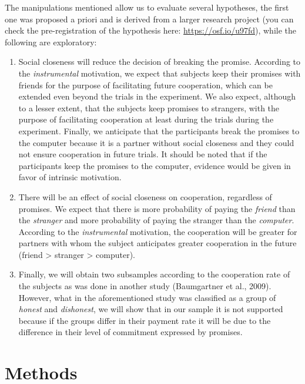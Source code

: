 \documentclass[12pt,]{article}
\begin{document}
The manipulations mentioned allow us to evaluate several hypotheses, the
first one was proposed a priori and is derived from a larger research
project (you can check the pre-registration of the hypothesis here:
\url{https://osf.io/u97fd}), while the following are exploratory:

\begin{enumerate}
\def\labelenumi{\arabic{enumi}.}
\item
  Social closeness will reduce the decision of breaking the promise.
  According to the \emph{instrumental} motivation, we expect that
  subjects keep their promises with friends for the purpose of
  facilitating future cooperation, which can be extended even beyond the
  trials in the experiment. We also expect, although to a lesser extent,
  that the subjects keep promises to strangers, with the purpose of
  facilitating cooperation at least during the trials during the
  experiment. Finally, we anticipate that the participants break the
  promises to the computer because it is a partner without social
  closeness and they could not ensure cooperation in future trials. It
  should be noted that if the participants keep the promises to the
  computer, evidence would be given in favor of intrinsic motivation.
\item
  There will be an effect of social closeness on cooperation, regardless
  of promises. We expect that there is more probability of paying the
  \emph{friend} than the \emph{stranger} and more probability of paying
  the stranger than the \emph{computer}. According to the
  \emph{instrumental} motivation, the cooperation will be greater for
  partners with whom the subject anticipates greater cooperation in the
  future (friend \textgreater{} stranger \textgreater{} computer).
\item
  Finally, we will obtain two subsamples according to the cooperation
  rate of the subjects as was done in another study (Baumgartner et al.,
  2009). However, what in the aforementioned study was classified as a
  group of \emph{honest} and \emph{dishonest}, we will show that in our
  sample it is not supported because if the groups differ in their
  payment rate it will be due to the difference in their level of
  commitment expressed by promises.
\end{enumerate}

\hypertarget{methods}{%
\section{Methods}\label{methods}}
\end{document}
